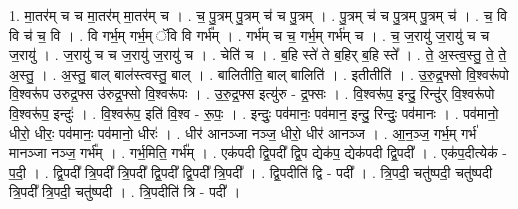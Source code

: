\documentclass[17pt]{extarticle}
\begin{document}
1. मा॒तर॑म् च च मा॒तर॑म् मा॒तर॑म् च । . च॒ पु॒त्रम् पु॒त्रम् च॑ च पु॒त्रम् । . पु॒त्रम् च॑ च पु॒त्रम् पु॒त्रम् च॑ । . च॒ वि वि च॑ च॒ वि । . वि गर्भ॒म् गर्भ॒म् ॅवि वि गर्भ᳚म् । . गर्भ॑म् च च॒ गर्भ॒म् गर्भ॑म् च । . च॒ ज॒रायु॑ ज॒रायु॑ च च ज॒रायु॑ । . ज॒रायु॑ च च ज॒रायु॑ ज॒रायु॑ च । . चेति॑ च । . ब॒हि स्ते॑ ते ब॒हिर् ब॒हि स्ते᳚ । . ते॒ अ॒स्त्व॒स्तु॒ ते॒ ते॒ अ॒स्तु॒ । . अ॒स्तु॒ बाल् बाल॑स्त्वस्तु॒ बाल् । . बालितीति॒ बाल् बालिति॑ । . इतीतीति॑ । . उ॒रु॒द्र॒फ्सो वि॒श्वरू॑पो वि॒श्वरू॑प उरुद्र॒फ्स उ॑रुद्र॒फ्सो वि॒श्वरू॑पः । . उ॒रु॒द्र॒फ्स इत्यु॑रु - द्र॒फ्सः । . वि॒श्वरू॑प॒ इन्दु॒ रिन्दु॑र् वि॒श्वरू॑पो वि॒श्वरू॑प॒ इन्दुः॑ । . वि॒श्वरू॑प॒ इति॑ वि॒श्व - रू॒पः॒ । . इन्दुः॒ पव॑मानः॒ पव॑मान॒ इन्दु॒ रिन्दुः॒ पव॑मानः । . पव॑मानो॒ धीरो॒ धीरः॒ पव॑मानः॒ पव॑मानो॒ धीरः॑ । . धीर॑ आनञ्जा नञ्ज॒ धीरो॒ धीर॑ आनञ्ज । . आ॒न॒ञ्ज॒ गर्भ॒म् गर्भ॑ मानञ्जा नञ्ज॒ गर्भ᳚म् । . गर्भ॒मिति॒ गर्भ᳚म् । . एक॑पदी द्वि॒पदी᳚ द्वि॒प द्येक॑प॒ द्येक॑पदी द्वि॒पदी᳚ । . एक॑प॒दीत्येक॑ - प॒दी॒ । . द्वि॒पदी᳚ त्रि॒पदी᳚ त्रि॒पदी᳚ द्वि॒पदी᳚ द्वि॒पदी᳚ त्रि॒पदी᳚ । . द्वि॒पदीति॑ द्वि - पदी᳚ । . त्रि॒पदी॒ चतु॑ष्पदी॒ चतु॑ष्पदी त्रि॒पदी᳚ त्रि॒पदी॒ चतु॑ष्पदी । . त्रि॒पदीति॑ त्रि - पदी᳚ । \newline
\end{document}
